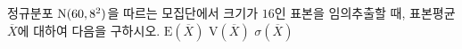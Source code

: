 정규분포 $\mathrm{N}(60{,}\mkern3mu\mathopen{}8^2)$을 따르는 모집단에서 크기가 $16$인 표본을 임의추출할 때, 표본평균 $\overline{X}$에 대하여 다음을 구하시오.
 $\mathrm{E}(\overline{X})$
 $\mathrm{V}(\overline{X})$
 $\sigma(\overline{X})$
